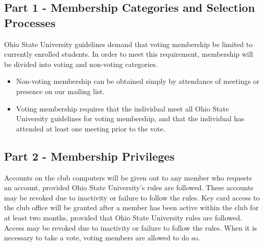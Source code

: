 \documentclass{article}
\begin{document}


	\subsection{Part 1 - Membership Categories and Selection Processes}
	Ohio State University guidelines demand that voting membership be limited to currently enrolled students.  In order to meet this requirement, membership will be divided into voting and non-voting categories.

	\begin{itemize}
		\item Non-voting membership can be obtained simply by attendance of meetings or presence on our mailing list.
		\item Voting membership requires that the individual meet all Ohio State University guidelines for voting membership, and that the individual has attended at least one meeting prior to the vote.
	\end{itemize}
	\subsection{Part 2 - Membership Privileges}

	Accounts on the club computers will be given out to any member who requests an account, provided Ohio State University's rules are followed.  These accounts may be revoked due to inactivity or failure to follow the rules.  Key card access to the club office will be granted after a member has been active within the club for at least two months, provided that Ohio State University rules are followed.  Access may be revoked due to inactivity or failure to follow the rules.
	When it is necessary to take a vote, voting members are allowed to do so.
\end{document}
